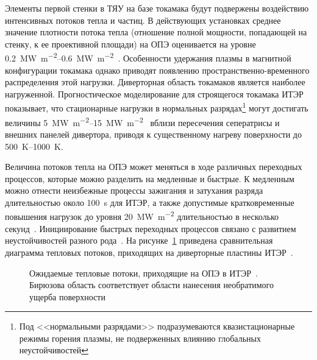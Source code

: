 Элементы первой стенки в ТЯУ на базе токамака будут подвержены воздействию интенсивных потоков тепла и частиц. В действующих установках среднее значение плотности потока тепла (отношение полной мощности, попадающей на стенку, к ее проективной площади) на ОПЭ оценивается на уровне \SIrange{0.2}{0.6}{\mega\watt\per\metre\squared}~\cite{Mazul2021}. Особенности удержания плазмы в магнитной конфигурации токамака однако приводят появлению пространственно-временного распределения этой нагрузки. Диверторная область токамаков является наиболее нагруженной. Прогностическое моделирование для строящегося токамака ИТЭР показывает, что стационарные нагрузки в нормальных разрядах\footnote{Под <<нормальными разрядами>> подразумеваются квазистационарные режимы горения плазмы, не подверженных влиянию глобальных неустойчивостей} могут достигать величины \SIrange{5}{15}{\mega\watt\per\meter\squared}~\cite{Pitts2019,Orrico2023} вблизи пересечения сеператрисы и внешних панелей дивертора, приводя к существенному нагреву поверхности до \SIrange{500}{1000}{\kelvin}.

Величина потоков тепла на ОПЭ может меняться в ходе различных переходных процессов, которые можно разделить на медленные и быстрые. К медленным можно отнести неизбежные процессы зажигания и затухания разряда длительностью около \SI{100}{\second} для ИТЭР, а также допустимые кратковременные повышения нагрузок до уровня \SI{20}{\mega\watt\per\meter\squared} длительностью в несколько секунд~\cite{Pitts2017}. Инициирование быстрых переходных процессов связано с развитием неустойчивостей разного рода~\cite{hender2007mhd}. На рисунке~\cref{fig:ch1/Heat_loads_diagram} приведена сравнительная диаграмма тепловых потоков, приходящих на диверторные пластины ИТЭР~\cite{Linke2019}.

\begin{figure}[ht]
    \caption{Ожидаемые тепловые потоки, приходящие на ОПЭ в ИТЭР~\cite{Linke2019}. Бирюзова область соответствует области нанесения необратимого ущерба поверхности}\label{fig:ch1/Heat_loads_diagram}
\end{figure}

